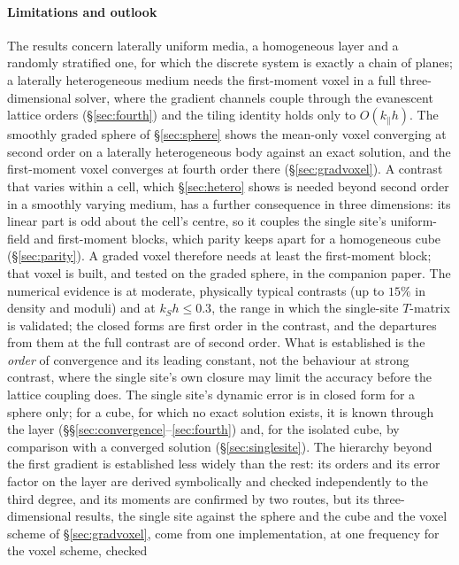 \documentclass[preprint,review,12pt]{elsarticle}
\begin{document}
\paragraph{Limitations and outlook} The results concern laterally uniform media, a homogeneous layer
and a randomly stratified one, for which the discrete system is exactly a chain of planes; a laterally heterogeneous medium needs the
first-moment voxel in a full three-dimensional solver, where the gradient channels couple through
the evanescent lattice orders (\S\ref{sec:fourth}) and the tiling identity holds only to
$O(k_\parallel h)$. The smoothly graded sphere of \S\ref{sec:sphere} shows the mean-only
voxel converging at second order on a laterally heterogeneous body against an exact solution, and the
first-moment voxel converges at fourth order there (\S\ref{sec:gradvoxel}).
A contrast that varies within a cell, which \S\ref{sec:hetero} shows is needed beyond second order in a
smoothly varying medium, has a further consequence in three dimensions: its linear part is odd about
the cell's centre, so it couples the single site's uniform-field and first-moment blocks, which parity
keeps apart for a homogeneous cube (\S\ref{sec:parity}). A graded voxel therefore needs at least the
first-moment block; that voxel is built, and tested on the graded sphere, in the companion paper. The numerical evidence is at moderate, physically typical contrasts (up to
$15\%$ in density and moduli) and at $k_Sh\le0.3$, the range in which the single-site $T$-matrix is
validated; the closed forms are first order in the contrast, and the departures from them at the
full contrast are of second order. What is established is the \emph{order} of convergence and its
leading constant, not the behaviour at strong contrast, where the single site's own closure may
limit the accuracy before the lattice coupling does. The single site's dynamic error is in closed
form for a sphere only; for a cube, for which no exact solution exists, it is known through the
layer (\S\S\ref{sec:convergence}--\ref{sec:fourth}) and, for the isolated cube, by comparison with a
converged solution (\S\ref{sec:singlesite}). The hierarchy beyond the first gradient is established
less widely than the rest: its orders and its error factor on the layer are derived symbolically and
checked independently to the third degree, and its moments are confirmed by two routes, but its
three-dimensional results, the single site against the sphere and the cube and the voxel scheme of
\S\ref{sec:gradvoxel}, come from one implementation, at one frequency for the voxel scheme, checked
\end{document}
